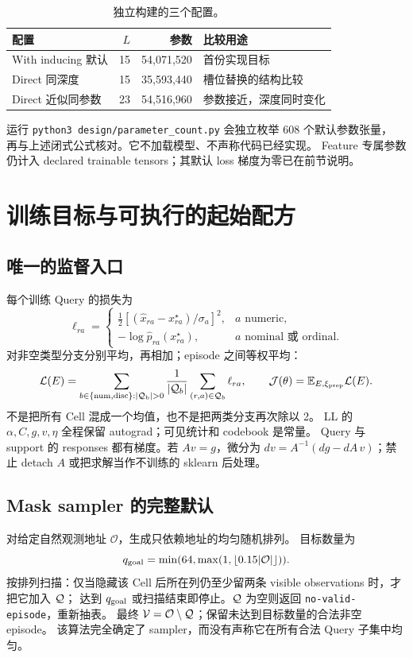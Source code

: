 \documentclass[11pt,UTF8,fontset=fandol]{ctexart}
\begin{document}
\begin{table}[htbp]\centering\small
\caption{独立构建的三个配置。}\label{tab:budgets}
\begin{tabularx}{\linewidth}{@{}l r r Y@{}}\toprule
配置 & $L$ & 参数 & 比较用途 \\\midrule
With inducing 默认 & 15 & 54,071,520 & 首份实现目标 \\
Direct 同深度 & 15 & 35,593,440 & 槽位替换的结构比较 \\
Direct 近似同参数 & 23 & 54,516,960 & 参数接近，深度同时变化 \\\bottomrule
\end{tabularx}
\end{table}

运行 \texttt{python3 design/parameter\_count.py} 会独立枚举 608 个默认参数张量，
再与上述闭式公式核对。它不加载模型、不声称代码已经实现。
Feature 专属参数仍计入 declared trainable tensors；其默认 loss 梯度为零已在前节说明。

\section{训练目标与可执行的起始配方}
\label{sec:training}

\subsection{唯一的监督入口}
每个训练 Query 的损失为
\begin{equation}
 \ell_{ra}=\begin{cases}
 \frac12[(\widehat x_{ra}-x^\star_{ra})/\sigma_a]^2,&a\text{ numeric},\\
 -\log\widehat p_{ra}(x^\star_{ra}),&a\text{ nominal 或 ordinal}.
 \end{cases}
\end{equation}
对非空类型分支分别平均，再相加；episode 之间等权平均：
\begin{equation}
 \mathcal L(E)=\sum_{b\in\{\rm num,disc\}:|\Q_b|>0}
       \frac1{|\Q_b|}\sum_{(r,a)\in\Q_b}\ell_{ra},
 \qquad \mathcal J(\theta)=\mathbb E_{E,\xi_{\rm prep}}\mathcal L(E).
 \label{eq:loss}
\end{equation}
不是把所有 Cell 混成一个均值，也不是把两类分支再次除以 2。
LL 的 $\alpha,C,g,v,\eta$ 全程保留 autograd；可见统计和 codebook 是常量。
Query 与 support 的 responses 都有梯度。若 $Av=g$，微分为
$dv=A^{-1}(dg-dA\,v)$；禁止 detach $A$ 或把求解当作不训练的 sklearn 后处理。

\subsection{Mask sampler 的完整默认}
对给定自然观测地址 $\mathcal O$，生成只依赖地址的均匀随机排列。
目标数量为
\begin{equation}
 q_{\rm goal}=\min(64,\max(1,\lfloor0.15|\mathcal O|\rfloor)).
\end{equation}
按排列扫描：仅当隐藏该 Cell 后所在列仍至少留两条 visible observations 时，才把它加入 $\mathcal Q$；
达到 $q_{\rm goal}$ 或扫描结束即停止。$\mathcal Q$ 为空则返回 \texttt{no-valid-episode}，重新抽表。
最终 $\mathcal V=\mathcal O\setminus\mathcal Q$；保留未达到目标数量的合法非空 episode。
该算法完全确定了 sampler，而没有声称它在所有合法 Query 子集中均匀。
\end{document}
